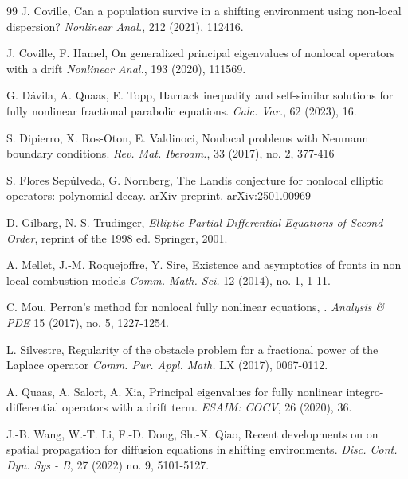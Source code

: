 \documentclass[11pt,a4paper]{amsart}
\begin{document}
\begin{thebibliography}{99}
J. Coville,
Can a population survive in a shifting environment using non-local dispersion?
{\it Nonlinear Anal.}, 212 (2021), 112416.

J. Coville, F. Hamel,
On generalized principal eigenvalues of nonlocal operators with
a drift
{\it Nonlinear Anal.}, 193 (2020), 111569.

G. Dávila, A. Quaas, E. Topp,
Harnack inequality and self-similar solutions for fully nonlinear fractional parabolic equations.
{\it Calc. Var.}, 62 (2023), 16.

S. Dipierro, X. Ros-Oton, E. Valdinoci,
Nonlocal problems with Neumann boundary conditions.
{\it Rev. Mat. Iberoam.}, 33 (2017), no. 2, 377-416

S. Flores Sepúlveda, G. Nornberg,
The Landis conjecture for nonlocal elliptic operators: polynomial decay.
arXiv preprint. arXiv:2501.00969

D. Gilbarg, N. S. Trudinger,
{\it Elliptic Partial Differential Equations of Second Order},
reprint of the 1998 ed. Springer, 2001.

A. Mellet, J.-M. Roquejoffre, Y. Sire,
Existence and asymptotics of fronts in non local combustion models
{\it Comm. Math. Sci.} 12 (2014), no. 1, 1-11.

C. Mou,
Perron's method for nonlocal fully nonlinear equations,
{\it. Analysis \& PDE} 15 (2017), no. 5, 1227-1254.

L. Silvestre,
Regularity of the obstacle problem for a fractional power of the Laplace operator
{\it Comm. Pur. Appl. Math.} LX (2017), 0067-0112.

A. Quaas, A. Salort, A. Xia,
Principal eigenvalues for fully nonlinear integro-differential operators with a drift term.
{\it ESAIM: COCV}, 26 (2020), 36.

J.-B. Wang, W.-T. Li, F.-D. Dong, Sh.-X. Qiao,
Recent developments on on spatial propagation for diffusion equations in shifting environments.
{\it Disc. Cont. Dyn. Sys - B}, 27 (2022) no. 9, 5101-5127.
\end{thebibliography}
\end{document}
